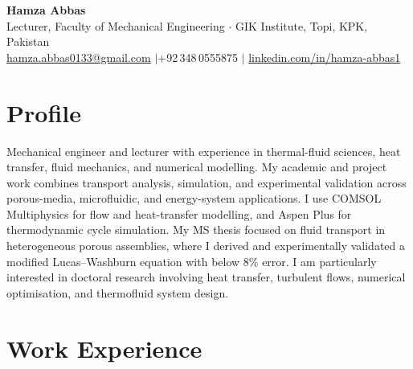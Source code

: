 \documentclass[11pt,a4paper]{article}
\begin{document}

\begin{center}
  {\LARGE\bfseries\color{accent} Hamza Abbas}\\[4pt]
  Lecturer, Faculty of Mechanical Engineering $\cdot$ GIK Institute, Topi, KPK,
  Pakistan\\[3pt]
  \href{mailto:hamza.abbas0133@gmail.com}{hamza.abbas0133@gmail.com}
  \quad$|$\quad +92\,348\,0555875
  \quad$|$\quad
  \href{https://linkedin.com/in/hamza-abbas1}{linkedin.com/in/hamza-abbas1}
\end{center}

\section{Profile}

Mechanical engineer and lecturer with experience in thermal-fluid sciences, heat
transfer, fluid mechanics, and numerical modelling. My academic and project work
combines transport analysis, simulation, and experimental validation across
porous-media, microfluidic, and energy-system applications. I use COMSOL
Multiphysics for flow and heat-transfer modelling, and Aspen Plus for
thermodynamic cycle simulation. My MS thesis focused on fluid transport in
heterogeneous porous assemblies, where I derived and experimentally validated a
modified Lucas--Washburn equation with below 8\% error. I am particularly
interested in doctoral research involving heat transfer, turbulent flows, numerical
optimisation, and thermofluid system design.

\section{Work Experience}
\end{document}
